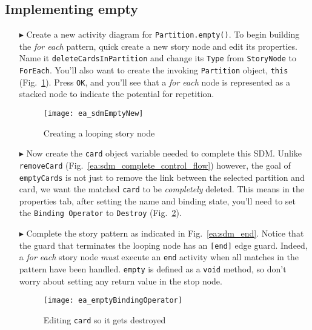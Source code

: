 \newpage
\hypertarget{emptyPartition vis}{}
\subsection{Implementing empty}
\genHeader

\begin{itemize}

\item[$\blacktriangleright$] Create a new activity diagram for \texttt{Partition.empty()}. To begin building the \emph{for each} pattern, quick create a new
story node and edit its properties. Name it \texttt{deleteCardsInPartition} and change its \texttt{Type} from \texttt{StoryNode} to \texttt{ForEach}. You'll
also want to create the invoking \texttt{Partition} object, \texttt{this} (Fig.~\ref{ea:sdm_foreach}). Press \texttt{OK}, and you'll see that a \emph{for each}
node is represented as a stacked node to indicate the potential for repetition.

\begin{figure}[htbp]
\begin{center}
  \texttt{[image: ea\_sdmEmptyNew]}
  \caption{Creating a looping story node}  
  \label{ea:sdm_foreach}
\end{center}
\end{figure}

\item[$\blacktriangleright$] Now create the \texttt{card} object variable needed to complete this SDM. Unlike \texttt{removeCard}
(Fig.~\ref{ea:sdm_complete_control_flow}) however, the goal of \texttt{emptyCards} is not just to remove the link between the selected partition and card, we
want the matched \texttt{card} to be \emph{completely} deleted. This means in the properties tab, after setting the name and binding state, you'll need to set
the \texttt{Binding Operator} to \texttt{Destroy} (Fig.~\ref{ea:sdm_bindingOperator}).

\item[$\blacktriangleright$] Complete the story pattern as indicated in Fig.~\ref{ea:sdm_end}. Notice that the guard that terminates the looping node has an
\texttt{[end]} edge guard. Indeed, a \emph{for each} story node \emph{must} execute an \texttt{end} activity when all matches in the pattern have been
handled. \texttt{empty} is defined as a \texttt{void} method, so don't worry about setting any return value in the stop node.

\begin{figure}[htbp]
\begin{center}
  \texttt{[image: ea\_emptyBindingOperator]}
  \caption{Editing \texttt{card} so it gets destroyed}  
  \label{ea:sdm_bindingOperator}
\end{center}
\end{figure}


\end{itemize}
